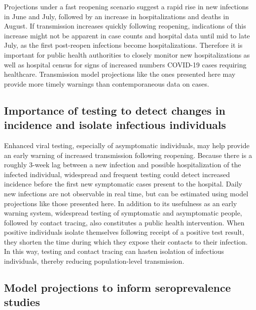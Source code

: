 \documentclass[11pt]{article}
\begin{document}
Projections under a fast reopening scenario suggest a rapid rise in new infections in June and July, followed by an increase in hospitalizations and deaths in August.  If transmission increases quickly following reopening, indications of this increase might not be apparent in case counts and hospital data until mid to late July, as the first post-reopen infections become hospitalizations.  Therefore it is important for public health authorities to closely monitor new hospitalizations as well as hospital census for signs of increased numbers COVID-19 cases requiring healthcare. Transmission model projections like the ones presented here may provide more timely warnings than contemporaneous data on cases.  


\subsection*{Importance of testing to detect changes in incidence and isolate infectious individuals}

Enhanced viral testing, especially of asymptomatic individuals, may help provide an early warning of increased transmission following reopening.  Because there is a roughly 3-week lag between a new infection and possible hospitalization of the infected individual, widespread and frequent testing could detect increased incidence before the first new symptomatic cases present to the hospital.  Daily new infections are not observable in real time, but can be estimated using model projections like those presented here.  In addition to its usefulness as an early warning system, widespread testing of symptomatic and asymptomatic people, followed by contact tracing, also constitutes a public health intervention. When positive individuals isolate themselves following receipt of a positive test result, they shorten the time during which they expose their contacts to their infection. In this way, testing and contact tracing can hasten isolation of infectious individuals, thereby reducing population-level transmission.  


\subsection*{Model projections to inform seroprevalence studies}
\end{document}
